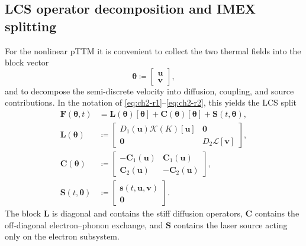 \subsection{LCS operator decomposition and IMEX splitting}
\label{sec:ch2-imex-split}

For the nonlinear pTTM it is convenient to collect the two thermal fields into the block vector
\[
    \boldsymbol{\theta}
    \coloneqq
    \begin{bmatrix}
        \mathbf{u} \\
        \mathbf{v}
    \end{bmatrix},
\]
and to decompose the semi-discrete velocity into diffusion, coupling, and source contributions. In the notation of \eqref{eq:ch2-r1}--\eqref{eq:ch2-r2}, this yields the LCS split
\begin{subequations}\label{eq:ch2-lcs-split}
    \begin{align}
        \mathbf{F}(\boldsymbol{\theta},t)
         & =
        \mathbf{L}(\boldsymbol{\theta})[\boldsymbol{\theta}]
        +
        \mathbf{C}(\boldsymbol{\theta})[\boldsymbol{\theta}]
        +
        \mathbf{S}(t,\boldsymbol{\theta}),
        \label{eq:ch2-lcs-split-a} \\
        \mathbf{L}(\boldsymbol{\theta})
         & \coloneqq
        \begin{bmatrix}
            D_1(\mathbf{u})\mathcal{K}(K)[\mathbf{u}] & \mathbf{0}                  \\
            \mathbf{0}                                & D_2 \mathcal{L}[\mathbf{v}]
        \end{bmatrix},
        \label{eq:ch2-lcs-split-b} \\
        \mathbf{C}(\boldsymbol{\theta})
         & \coloneqq
        \begin{bmatrix}
            -\mathbf{C}_1(\mathbf{u}) & \mathbf{C}_1(\mathbf{u})  \\
            \mathbf{C}_2(\mathbf{u})  & -\mathbf{C}_2(\mathbf{u})
        \end{bmatrix},
        \label{eq:ch2-lcs-split-c} \\
        \mathbf{S}(t,\boldsymbol{\theta})
         & \coloneqq
        \begin{bmatrix}
            \mathbf{s}(t,\mathbf{u},\mathbf{v}) \\
            \mathbf{0}
        \end{bmatrix}.
        \label{eq:ch2-lcs-split-d}
    \end{align}
\end{subequations}
The block \(\mathbf{L}\) is diagonal and contains the stiff diffusion operators, \(\mathbf{C}\) contains the off-diagonal electron--phonon exchange, and \(\mathbf{S}\) contains the laser source acting only on the electron subsystem.

